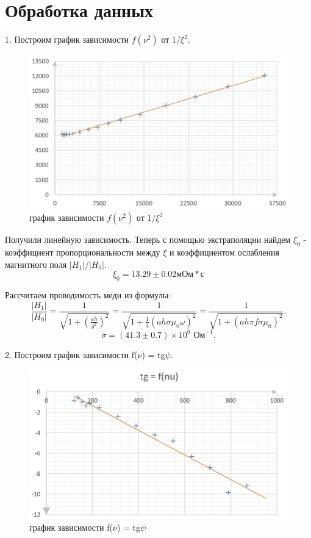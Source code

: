 \documentclass[a4paper, 12pt]{article} %
\begin{document}
	\section *{Обработка данных}
	1. Построим график зависимости $f(\nu^2)$ от $1/\xi^2$.
		\begin{figure}
		\centering
		\includegraphics[width = 18cm]{graph1.jpg}
		\caption{график зависимости $f(\nu^2)$ от $1/\xi^2$}
	\end{figure}
	
	Получили линейную зависимость. Теперь с помощью экстраполяции найдем $\xi_0$ - коэффициент пропорциональности между $\xi$ и коэффициентом ослабления магнитного поля $|H_1|/|H_0|$.
	\begin{equation*}
		\xi_0  = 13.29 \pm 0.02 мОм * с
	\end{equation*}
	
	Рассчитаем проводимость меди из формулы:
	\begin{equation}
				\dfrac{|H_1|}{|H_0|} = \dfrac{1}{\sqrt{1+ \left(\frac{ah}{\delta^2}\right)^2}} = \dfrac{1}{\sqrt{1 + \frac{1}{4}\left(ah\sigma\mu_0\omega\right)^2}} = \dfrac{1}{\sqrt{1 + \left(ah\pi f\sigma\mu_0\right)^2}}.
			\end{equation}
	\begin{equation*}
\sigma  = (41.3 \pm 0.7)\times 10^6 \text{ Ом}^{-1}.
	\end{equation*}


2. Построим график зависимости f($\nu$) =  tg$\psi$. 
		\begin{figure}
		\centering
		\includegraphics[width = 15cm]{graph2.jpg}
		\caption{график зависимости f($\nu$) = tg$\psi$ }
	\end{figure}
	
\end{document}
